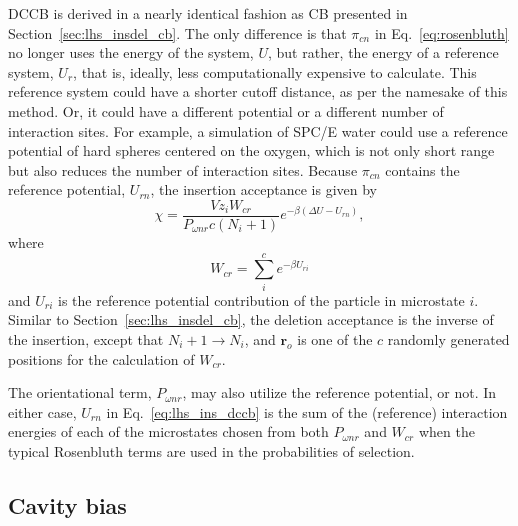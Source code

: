 \documentclass[
  9pt,
  bestpractices,
]{livecoms}
\begin{document}
DCCB \cite{vlugt_improving_1998} is derived in a nearly identical fashion as CB presented in Section~\ref{sec:lhs_insdel_cb}.
The only difference is that $\pi_{cn}$ in Eq.~\ref{eq:rosenbluth} no longer uses the energy of the system, $U$, but rather, the energy of a reference system, $U_{r}$, that is, ideally, less computationally expensive to calculate.
This reference system could have a shorter cutoff distance, as per the namesake of this method.
Or, it could have a different potential or a different number of interaction sites.
For example, a simulation of SPC/E water could use a reference potential of hard spheres centered on the oxygen, which is not only short range but also reduces the number of interaction sites.
Because $\pi_{cn}$ contains the reference potential, $U_{rn}$, the insertion acceptance is given by
\begin{equation}
\chi = \frac{Vz_i W_{{c}r}}{P_{\omega nr}{c}(N_i+1)}e^{-\beta(\Delta U - U_{rn})},
\label{eq:lhs_ins_dccb}
\end{equation}
where
\begin{equation}
W_{{c}r}=\sum_{i}^{c} e^{-\beta U_{ri}}
\label{eq:wcr}
\end{equation}
and $U_{ri}$ is the reference potential contribution of the particle in microstate $i$.
Similar to Section~\ref{sec:lhs_insdel_cb}, the deletion acceptance is the inverse of the insertion, except that $N_i+1 \rightarrow N_i$, and $\mathbf{r}_o$ is one of the $c$ randomly generated positions for the calculation of $W_{{c}r}$.

The orientational term, $P_{\omega nr}$, may also utilize the reference potential, or not.
In either case, $U_{rn}$ in Eq.~\ref{eq:lhs_ins_dccb} is the sum of the (reference) interaction energies of each of the microstates chosen from both $P_{\omega nr}$ and $W_{cr}$ when the typical Rosenbluth terms are used in the probabilities of selection.

\subsection{\label{sec:lhs_insdel_cavity}Cavity bias}
\end{document}
